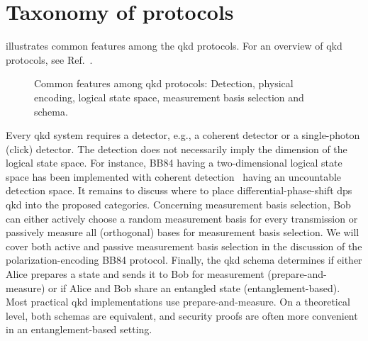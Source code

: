 \section{Taxonomy of protocols}

 illustrates common features among the \gls{qkd} protocols.
For an overview of \gls{qkd} protocols, see Ref.~\cite{Duvsek2006}.
\begin{figure}[htb]
	\centering
	
	\caption{Common features among \gls{qkd} protocols: Detection, physical encoding, logical state space, measurement basis selection and schema.}\label{fig:qkd_classification}
\end{figure}
Every \gls{qkd} system requires a detector, e.g., a coherent detector or a single-photon (click) detector.
The detection does not necessarily imply the dimension of the logical state space.
For instance, BB84 having a two-dimensional logical state space has been implemented with coherent detection~\cite{Qi2021} having an uncountable detection space.
It remains to discuss where to place differential-phase-shift \gls{dps} \gls{qkd} into the proposed categories.
Concerning measurement basis selection, Bob can either actively choose a random measurement basis for every transmission or passively measure all (orthogonal) bases for measurement basis selection.
We will cover both active and passive measurement basis selection in the discussion of the polarization-encoding BB84 protocol.
Finally, the \gls{qkd} schema determines if either Alice prepares a state and sends it to Bob for measurement (prepare-and-measure) or if Alice and Bob share an entangled state (entanglement-based).
Most practical \gls{qkd} implementations use prepare-and-measure.
On a theoretical level, both schemas are equivalent, and security proofs are often more convenient in an entanglement-based setting.

